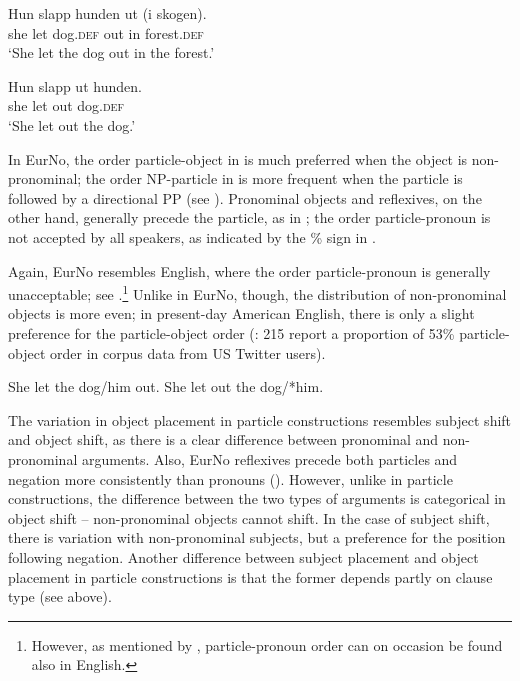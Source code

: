 \documentclass[output=paper]{langscibook}
\begin{document}
\ea\label{ex:larsson:27}
\ea\label{ex:larsson:27a}
\gll Hun slapp hunden ut (i skogen).\\
she let dog.\textsc{def} out in forest.\textsc{def}\\
\glt ‘She let the dog out in the forest.’

\ex\label{ex:larsson:27b}
\gll Hun slapp ut hunden.\\
	she let out dog.\textsc{def}\\
\glt ‘She let out the dog.’
\z
\z

In EurNo, the order particle-object in  is much preferred when the object is non-pronominal; the order NP-particle in  is more frequent when the particle is followed by a directional PP (see \citealt{LundquistTengesdal2022}). Pronominal objects and reflexives, on the other hand, generally precede the particle, as in ; the order particle-pronoun is not accepted by all speakers, as indicated by the \% sign in . 

\ea\label{ex:larsson:28-first}
\judgewidth{\%}
\z
\z

Again, EurNo resembles English, where the order particle-pronoun is generally unacceptable; see .\footnote{However, as mentioned by \citet{Toivonen2003}, particle-pronoun order can on occasion be found also in English.} Unlike in EurNo, though, the distribution of non-pronominal objects is more even; in present-day American English, there is only a slight preference for the particle-object order (\citealt{HaddicanEtAl2020}: 215 report a proportion of 53\% particle-object order in corpus data from US Twitter users).

\ea\label{ex:larsson:29-first}
\ea She let the dog/him out.\label{ex:larsson:29-firsta}
\ex She let out the dog/*him.\label{ex:larsson:29-firstb}
\z
\z

The variation in object placement in particle constructions resembles subject shift and object shift, as there is a clear difference between pronominal and non-pronominal arguments. Also, EurNo reflexives precede both particles and negation more consistently than pronouns (\citealt{LundquistTengesdal2022}). However, unlike in particle constructions, the difference between the two types of arguments is categorical in object shift – non-pronominal objects cannot shift. In the case of subject shift, there is variation with non-pronominal subjects, but a preference for the position following negation. Another difference between subject placement and object placement in particle constructions is that the former depends partly on clause type (see  above). 
\end{document}
